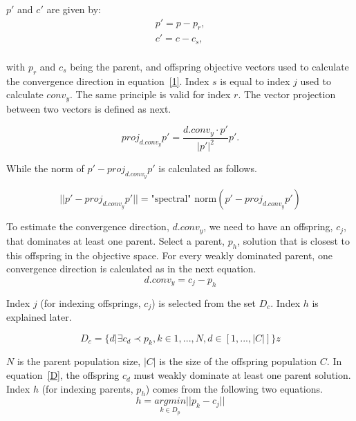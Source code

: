 $p\prime$ and $c\prime $ are given by:
\vspace{-1em}
\begin{equation}
\begin{split}
p\prime = p - p_r,\\
c\prime = c - c_s,\\
\end{split}
\end{equation}

with $p_r$ and $c_s$ being the parent, and offspring objective vectors used to calculate the convergence direction in equation~\ref{1}. Index $s$ is equal to index $j$ used to calculate $conv_{y}$. The same principle is valid for index $r$. The vector projection between two vectors is defined as next.

\begin{equation}
proj_{d.conv_{y}}p \prime = \frac {{d.conv_{y}} \cdot {p \prime}} {|{p \prime}|^2}{{p \prime}}.
\end{equation}

While the norm of $p \prime - proj_{d.conv_{y}}p \prime$ is calculated as follows.

\begin{equation}
||p \prime - proj_{d.conv_{y}}p \prime|| = \text{"spectral" norm}(p \prime - proj_{d.conv_{y}}p \prime)
\end{equation}


To estimate the convergence direction, $d.conv_{y}$, we need to have an offspring, $c_j$, that dominates at least one parent. Select a parent, $p_h$, solution that is closest to this offspring in the objective space.  For every weakly dominated parent, one convergence direction is calculated as in the next equation.
\begin{equation}
\label{1}
d.conv_{y} = c_j - p_h
\end{equation}

Index $j$ (for indexing offsprings, $c_j$) is selected from the set $D_c$. Index $h$ is explained later.

\vspace{-1em}
\begin{equation}
\label{D}
D_c = \{d| \exists c_d \prec p_k, k \in {1,..., N}, d \in [1,..., |C|]\}
z\end{equation}

$N$ is the parent population size, $|C|$ is the size of the offspring population $C$. In equation~\ref{D}, the offspring $c_d$ must weakly dominate at least one parent solution. Index $h$ (for indexing parents, $p_h$) comes from the following two equations.
\begin{equation}
h = \underset{k \in D_p }{argmin} || p_k - c_j ||
\end{equation}

